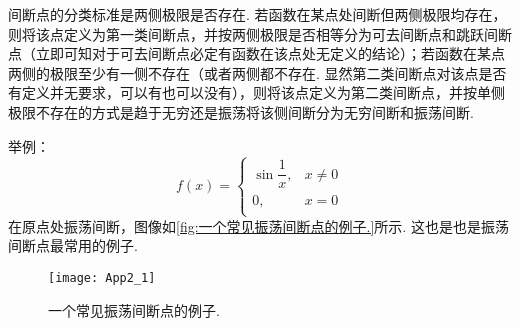     \hspace*{2em}间断点的分类标准是两侧极限是否存在. 若函数在某点处间断但两侧极限均存在，则将该点定义为第一类间断点，并按两侧极限是否相等分为可去间断点和跳跃间断点（立即可知对于可去间断点必定有函数在该点处无定义的结论）；若函数在某点两侧的极限至少有一侧不存在（或者两侧都不存在. 显然第二类间断点对该点是否有定义并无要求，可以有也可以没有），则将该点定义为第二类间断点，并按单侧极限不存在的方式是趋于无穷还是振荡将该侧间断分为无穷间断和振荡间断.

    \hspace*{2em}举例：
    $$f\left( x \right) =
    \begin{cases}
      \sin \dfrac{1}{x}, & x \ne 0\\
      0, & x=0 \\
    \end{cases}$$
    在原点处振荡间断，图像如\autoref{fig:一个常见振荡间断点的例子.}所示. 这也是也是振荡间断点最常用的例子.
    \begin{figure}[!h]
      \centering
      \texttt{[image: App2\_1]}
      \caption{一个常见振荡间断点的例子.}\label{fig:一个常见振荡间断点的例子.}
    \end{figure}


